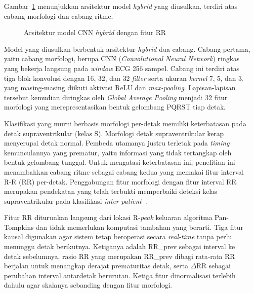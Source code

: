 Gambar~\ref{fig:pipeline-training} menunjukkan arsitektur model \textit{hybrid} yang diusulkan, terdiri atas cabang morfologi dan cabang ritme.

\begin{figure}[H]
  \centering
  \caption{Arsitektur model CNN \textit{hybrid} dengan fitur RR}
  \label{fig:pipeline-training}
\end{figure}

Model yang diusulkan berbentuk arsitektur \textit{hybrid} dua cabang. Cabang
pertama, yaitu cabang morfologi, berupa CNN
(\textit{Convolutional Neural Network}) ringkas yang bekerja langsung
pada \textit{window} ECG 256 sampel. Cabang ini terdiri atas tiga blok konvolusi dengan
16, 32, dan 32 \textit{filter} serta ukuran \textit{kernel} 7, 5, dan 3, yang
masing-masing diikuti aktivasi ReLU dan \textit{max-pooling}. Lapisan-lapisan
tersebut kemudian diringkas oleh \textit{Global Average Pooling} menjadi 32
fitur morfologi yang merepresentasikan bentuk gelombang PQRST tiap detak.

Klasifikasi yang murni berbasis morfologi per-detak memiliki keterbatasan pada
detak supraventrikular (kelas S). Morfologi detak supraventrikular kerap
menyerupai detak normal. Pembeda utamanya justru terletak pada
\textit{timing} kemunculannya yang prematur, yaitu informasi yang tidak
tertangkap oleh bentuk gelombang tunggal. Untuk mengatasi keterbatasan ini,
penelitian ini menambahkan cabang ritme sebagai cabang kedua yang memakai fitur
interval R-R (RR) per-detak. Penggabungan fitur
morfologi dengan fitur interval RR merupakan pendekatan yang telah terbukti
memperbaiki deteksi kelas supraventrikular pada klasifikasi
\textit{inter-patient}~\cite{dechazal_2004}.

Fitur RR diturunkan langsung dari lokasi R-\textit{peak} keluaran algoritma
Pan-Tompkins dan tidak
memerlukan komputasi tambahan yang berarti. Tiga fitur kausal digunakan agar
sistem tetap beroperasi secara \textit{real-time} tanpa perlu menunggu detak
berikutnya. Ketiganya adalah RR\_prev sebagai interval ke detak sebelumnya, rasio RR
yang merupakan RR\_prev dibagi rata-rata RR berjalan untuk menangkap derajat
prematuritas detak, serta $\Delta$RR sebagai perubahan interval antardetak
berurutan. Ketiga fitur dinormalisasi terlebih dahulu agar skalanya sebanding
dengan fitur morfologi.

